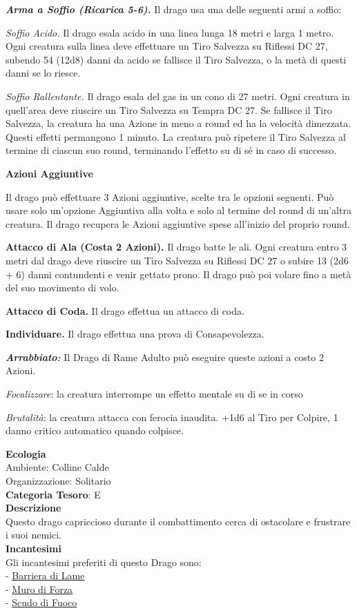 \begin{multicols}{2}
{\emph{\textbf{Arma a Soffio (Ricarica 5-6).}} Il drago usa una delle seguenti armi a soffio:

\emph{Soffio Acido.} Il drago esala acido in una linea lunga 18 metri e larga 1 metro. Ogni creatura sulla linea deve effettuare un Tiro Salvezza su Riflessi DC 27, subendo 54 (12d8) danni da acido se fallisce il Tiro Salvezza, o la metà di questi danni se lo riesce.

\emph{Soffio Rallentante.} Il drago esala del gas in un cono di 27 metri. Ogni creatura in quell'area deve riuscire un Tiro Salvezza su Tempra DC 27. Se fallisce il Tiro Salvezza, la creatura ha una Azione in meno a round ed ha la velocità dimezzata. Questi effetti permangono 1 minuto. La creatura può ripetere il Tiro Salvezza al termine di ciascun suo round, terminando l'effetto su di sé in caso di successo.

\textbf{Azioni Aggiuntive}

Il drago può effettuare 3 Azioni aggiuntive, scelte tra le opzioni seguenti. Può usare solo un'opzione Aggiuntiva alla volta e solo al termine del round di un'altra creatura. Il drago recupera le Azioni aggiuntive spese all'inizio del proprio round.

\textbf{Attacco di Ala (Costa 2 Azioni).} Il drago batte le ali. Ogni creatura entro 3 metri dal drago deve riuscire un Tiro Salvezza su Riflessi DC 27 o subire 13 (2d6 + 6) danni contundenti e venir gettato prono. Il drago può poi volare fino a metà del suo movimento di volo.

\textbf{Attacco di Coda.} Il drago effettua un attacco di coda.

\textbf{Individuare.} Il drago effettua una prova di Consapevolezza.

\emph{\textbf{Arrabbiato:}} Il Drago di Rame Adulto può eseguire queste azioni a costo 2 Azioni.

\emph{Focalizzare}: la creatura interrompe un effetto mentale su di se in corso

\emph{Brutalità}: la creatura attacca con ferocia inaudita. +1d6 al Tiro per Colpire, 1 danno critico automatico quando colpisce.

\textbf{Ecologia}\\
Ambiente: Colline Calde\\
Organizzazione: Solitario\\
\textbf{Categoria Tesoro}: E\\
\textbf{Descrizione}\\
Questo drago capriccioso durante il combattimento cerca di ostacolare e frustrare i suoi nemici.\\
\textbf{Incantesimi}\\
Gli incantesimi preferiti di questo Drago sono:\\
- \hyperlink{Barriera di Lame}{Barriera di Lame}\\
- \hyperlink{Muro di Forza}{Muro di Forza}\\
- \hyperlink{Scudo di Fuoco}{Scudo di Fuoco}

}
\end{multicols}
